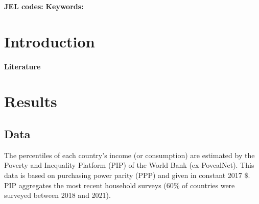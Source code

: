 
\begin{abstract}

\end{abstract}

\textbf{JEL codes:} 
\textbf{Keywords:} 

\tableofcontents

\onehalfspacing %


\section{Introduction}%


\paragraph{Literature} 



\section{Results}
\subsection{Data}\label{subsec:data}
The percentiles of each country's income (or consumption) are estimated by the Poverty and Inequality Platform (PIP) of the World Bank (ex-PovcalNet). This data is based on purchasing power parity (PPP) and given in constant 2017 \$. PIP aggregates the most recent household surveys (60\% of countries were surveyed between 2018 and 2021). 


